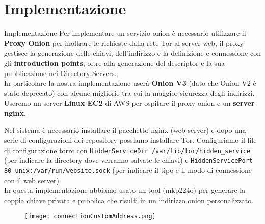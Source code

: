 \section{Implementazione}
\begin{frame}{Implementazione}
    Per implementare un servizio onion è necessario utilizzare il \textbf{Proxy Onion} per inoltrare le richieste dalla rete Tor al server web, il proxy gestisce la generazione delle chiavi, dell'indirizzo e la definizione e connessione con gli \textbf{introduction points}, oltre alla generazione del descriptor e la sua pubblicazione nei Directory Servers. \\
    In particolare la nostra implementazione userà \textbf{Onion V3} (dato che Onion V2 è stato deprecato) con alcune migliorie tra cui la maggior sicurezza degli indirizzi. \\
    Useremo un server \textbf{Linux EC2} di AWS per ospitare il proxy onion e un \textbf{server nginx}.
\end{frame}

\begin{frame}
    Nel sistema è necessario installare il pacchetto nginx (web server) e dopo una serie di configurazioni dei repository possiamo installare Tor. 
    \newline
    Configuriamo il file di configurazione torrc con \lstinline{HiddenServiceDir /var/lib/tor/hidden_service} (per indicare la directory dove verranno salvate le chiavi) e \lstinline{HiddenServicePort 80 unix:/var/run/website.sock} (per indicare il tipo e il modo di connessione con il web server). \\
    In questa implementazione abbiamo usato un tool (mkp224o) per generare la coppia chiave privata e pubblica che risulti in un indirizzo onion personalizzato.
\end{frame}

\begin{frame}
    \begin{figure}
        \centering
        \texttt{[image: connectionCustomAddress.png]}
    \end{figure}
\end{frame}

